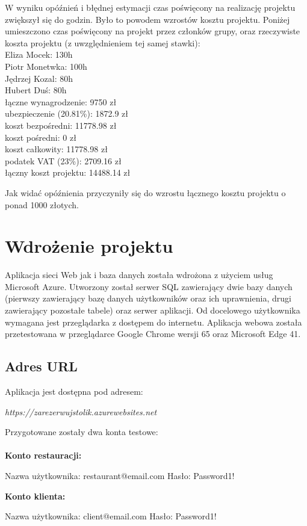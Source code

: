 \documentclass{article}
\newcommand\tab[1][1cm]{\hspace*{#1}}
\begin{document}
W wyniku opóźnień i błędnej estymacji czas poświęcony na realizację projektu zwiększył się do  godzin. Było to powodem wzrostów kosztu projektu. Poniżej umieszczono czas poświęcony na projekt przez członków grupy, oraz rzeczywiste koszta projektu (z uwzględnieniem tej samej stawki): \\

\hspace*{0.35cm} Eliza Mocek: 130h \\
\tab Piotr Monetwka: 100h \\
\tab Jędrzej Kozal: 80h \\
\tab Hubert Duś: 80h \\

\hspace*{0.35cm} łączne wynagrodzenie: 9750 zł \\
\tab ubezpieczenie (20.81\%): 1872.9 zł \\
\tab koszt bezpośredni: 11778.98 zł \\
\tab koszt pośredni: 0 zł \\
\tab koszt całkowity: 11778.98 zł \\
\tab podatek VAT (23\%): 2709.16 zł \\
\tab łączny koszt projektu: 14488.14 zł

Jak widać opóźnienia przyczyniły się do wzrostu łącznego kosztu projektu o ponad 1000 złotych. 

\newpage

\section{Wdrożenie projektu}
Aplikacja sieci Web jak i baza danych została wdrożona z użyciem usług Microsoft Azure. Utworzony został serwer SQL zawierający dwie bazy danych (pierwszy zawierający bazę danych użytkowników oraz ich uprawnienia, drugi zawierający pozostałe tabele) oraz serwer aplikacji. Od docelowego użytkownika wymagana jest przeglądarka z dostępem do internetu. Aplikacja webowa została przetestowana w przeglądarce Google Chrome wersji 65 oraz Microsoft Edge 41.
\subsection{Adres URL}
Aplikacja jest dostępna pod adresem:
\begin{center}
\textit{https://zarezerwujstolik.azurewebsites.net}
\end{center}
Przygotowane zostały dwa konta testowe:\\\\
\textbf{Konto restauracji:}
\begin{center}
Nazwa użytkownika: restaurant@email.com Hasło: Password1!
\end{center}
\textbf{Konto klienta:}
\begin{center}
Nazwa użytkownika: client@email.com Hasło: Password1!
\end{center}
\end{document}
